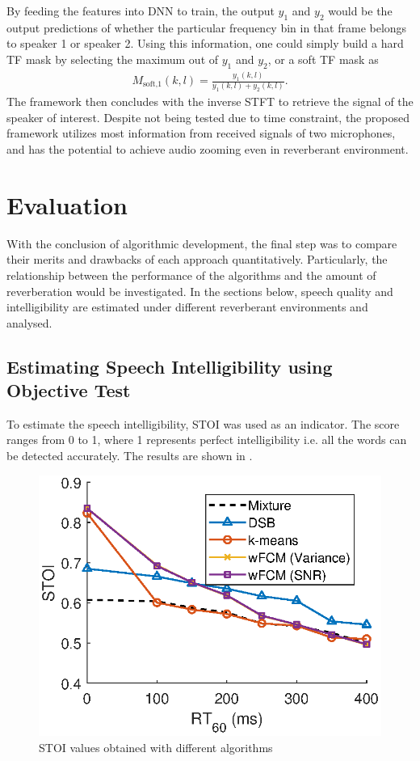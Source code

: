 \documentclass[a4paper,twoside,12pt,hidelinks]{article}
\begin{document}
By feeding the features into DNN to train, the output $y_1$ and $y_2$ would be the output predictions of whether the particular frequency bin in that frame belongs to speaker 1 or speaker 2. Using this information, one could simply build a hard TF mask by selecting the maximum out of $y_1$ and $y_2$, or a soft TF mask as
\begin{align}
M_\text{soft,1}(k,l)=\frac{y_1(k,l)}{y_1(k,l)+y_2(k,l)}.
\end{align}
The framework then concludes with the inverse STFT to retrieve the signal of the speaker of interest. Despite not being tested due to time constraint, the proposed framework utilizes most information from received signals of two microphones, and has the potential to achieve audio zooming even in reverberant environment.

\newpage
\section{Evaluation}
\label{sect:evaluation}
With the conclusion of algorithmic development, the final step was to compare their merits and drawbacks of each approach quantitatively. Particularly, the relationship between the performance of the algorithms and the amount of reverberation would be investigated. In the sections below, speech quality and intelligibility are estimated under different reverberant environments and analysed.

\subsection{Estimating Speech Intelligibility using Objective Test}
To estimate the speech intelligibility, STOI was used as an indicator. The score ranges from 0 to 1, where 1 represents perfect intelligibility i.e. all the words can be detected accurately. The results are shown in .

\begin{figure}[H]
\centering
\includegraphics[width=0.49\linewidth]{evalstoi}
\caption{STOI values obtained with different algorithms}
\label{fig:evalstoi}
\end{figure}
\end{document}
